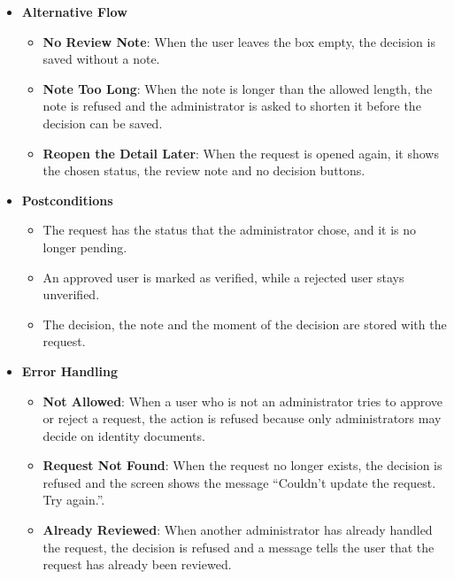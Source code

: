 \begin{itemize}[leftmargin=1.6em,topsep=4pt,itemsep=3pt,parsep=0pt,label=$\bullet$]
\begin{itemize}[leftmargin=2.2em,topsep=2pt,itemsep=3pt,parsep=0pt,label=$\circ$]
\begin{itemize}[leftmargin=2.2em,topsep=2pt,itemsep=3pt,parsep=0pt,label=$\blacksquare$]
                \end{itemize}
            \item \textbf{See the Result}: When the decision is saved, the status badge of the request changes and the decision buttons disappear, so the request is now read-only.
        \end{itemize}
    \item \textbf{Alternative Flow}
        \begin{itemize}[leftmargin=2.2em,topsep=2pt,itemsep=3pt,parsep=0pt,label=$\circ$]
            \item \textbf{No Review Note}: When the user leaves the box empty, the decision is saved without a note.
            \item \textbf{Note Too Long}: When the note is longer than the allowed length, the note is refused and the administrator is asked to shorten it before the decision can be saved.
            \item \textbf{Reopen the Detail Later}: When the request is opened again, it shows the chosen status, the review note and no decision buttons.
        \end{itemize}
    \item \textbf{Postconditions}
        \begin{itemize}[leftmargin=2.2em,topsep=2pt,itemsep=3pt,parsep=0pt,label=$\circ$]
            \item The request has the status that the administrator chose, and it is no longer pending.
            \item An approved user is marked as verified, while a rejected user stays unverified.
            \item The decision, the note and the moment of the decision are stored with the request.
        \end{itemize}
    \item \textbf{Error Handling}
        \begin{itemize}[leftmargin=2.2em,topsep=2pt,itemsep=3pt,parsep=0pt,label=$\circ$]
            \item \textbf{Not Allowed}: When a user who is not an administrator tries to approve or reject a request, the action is refused because only administrators may decide on identity documents.
            \item \textbf{Request Not Found}: When the request no longer exists, the decision is refused and the screen shows the message ``Couldn't update the request. Try again.''.
            \item \textbf{Already Reviewed}: When another administrator has already handled the request, the decision is refused and a message tells the user that the request has already been reviewed.

\end{itemize}
\end{itemize}
